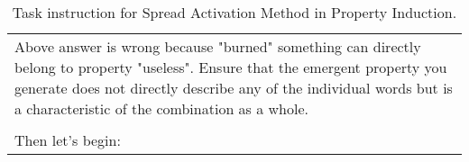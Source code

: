 \begin{table*}[htbp]
\begin{tabular}{@{}p{\linewidth}@{}}
\\
Above answer is wrong because "burned" something can directly belong to property "useless". Ensure that the emergent property you generate does not directly describe any of the individual words but is a characteristic of the combination as a whole.\\
\\
Then let's begin:\\
\bottomrule
\end{tabular}
    \caption{Task instruction for Spread Activation Method in Property Induction.}
    \label{tab:pi_prompt_sa}
\end{table*}
